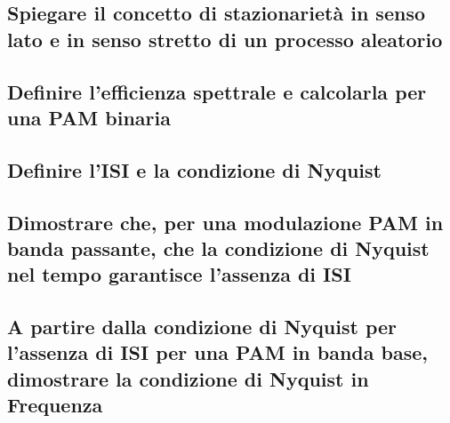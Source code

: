 \documentclass[12pt,oneside,openany]{memoir}
\numberwithin{equation}{subsection}
\begin{document}
\subsection{Spiegare il concetto di stazionariet\`a in senso lato e in senso
stretto di un processo aleatorio}


\subsection{Definire l'efficienza spettrale e calcolarla per una PAM binaria}


\subsection{Definire l'ISI e la condizione di Nyquist}


\subsection{Dimostrare che, per una modulazione PAM in banda passante, che la
condizione di Nyquist nel tempo garantisce l'assenza di ISI}


\subsection{A partire dalla condizione di Nyquist per l'assenza di ISI per una
PAM in banda base, dimostrare la condizione di Nyquist in Frequenza}
\end{document}
